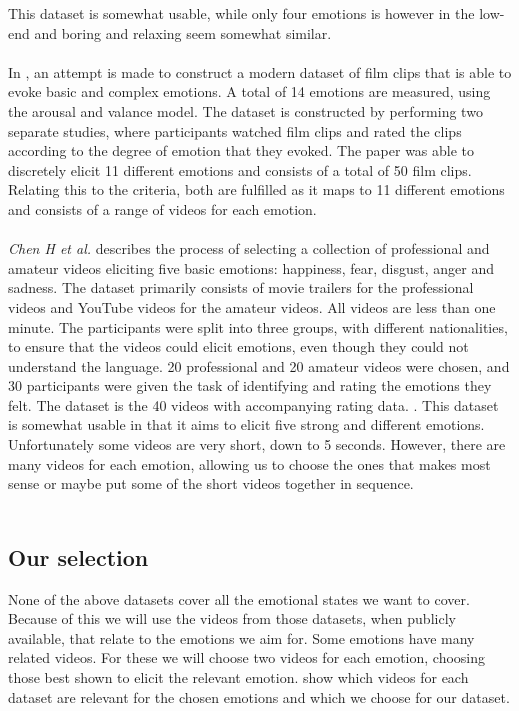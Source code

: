 This dataset is somewhat usable, while only four emotions is however in the low-end and boring and relaxing seem somewhat similar. \\\\
In \cite{FilmClips}, an attempt is made to construct a modern dataset of film clips that is able to evoke basic and complex emotions. A total of 14 emotions are measured, using the arousal and valance model. The dataset is constructed by performing two separate studies, where participants watched film clips and rated the clips according to the degree of emotion that they evoked. The paper was able to discretely elicit 11 different emotions and consists of a total of 50 film clips. Relating this to the criteria, both are fulfilled as it maps to 11 different emotions and consists of a range of videos for each emotion.\\\\
\textit{Chen H et al.} describes the process of selecting a collection of professional and amateur videos eliciting five basic emotions: happiness, fear, disgust, anger and sadness. The dataset primarily consists of movie trailers for the professional videos and YouTube videos for the amateur videos. All videos are less than one minute.
The participants were split into three groups, with different nationalities, to ensure that the videos could elicit emotions, even though they could not understand the language. 20 professional and 20 amateur videos were chosen, and 30 participants were given the task of identifying and rating the emotions they felt. The dataset is the 40 videos with accompanying rating data. \cite{CHEN2021106662}.
This dataset is somewhat usable in that it aims to elicit five strong and different emotions. Unfortunately some videos are very short, down to 5 seconds. However, there are many videos for each emotion, allowing us to choose the ones that makes most sense or maybe put some of the short videos together in sequence. \\\\

\subsection{Our selection}
None of the above datasets cover all the emotional states we want to cover. Because of this we will use the videos from those datasets, when publicly available, that relate to the emotions we aim for. Some emotions have many related videos. For these we will choose two videos for each emotion, choosing those best shown to elicit the relevant emotion.  show which videos for each dataset are relevant for the chosen emotions and which we choose for our dataset.


